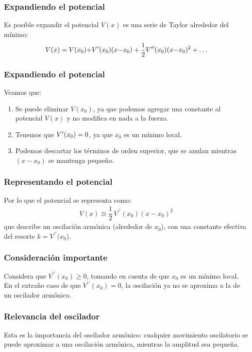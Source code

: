 \documentclass[12pt]{beamer}
\begin{document}
\begin{frame}
\frametitle{Expandiendo el potencial}
Es posible expandir el potencial $V(x)$ es una serie de Taylor alrededor del mínimo:
\pause
\begin{align*}
V(x) = V(x_{0}) {+} {V}^{\prime} (x_{0}) (x {-} x_{0}) + \dfrac{1}{2} {V}^{\prime \prime} (x_{0}) (x {-} x_{0})^{2} + \ldots
\end{align*}
\end{frame}
\begin{frame}
\frametitle{Expandiendo el potencial}
Veamos que:
\pause
{}
\begin{enumerate}[<+->]
\item Se puede eliminar $V(x_{0})$, ya que podemos agregar una constante al potencial $V(x)$ y no modifica en nada a la fuerza.
\item Tenemos que ${V}^{\prime} (x_{0}) = 0$, ya que $x_{0}$ es un mínimo local.
\item Podemos descartar los términos de orden superior, que se anulan mientras $(x - x_{0})$ se mantenga pequeño.
\end{enumerate}
\end{frame}
\begin{frame}
\frametitle{Representando el potencial}
Por lo que el potencial se representa como:
\pause
\begin{align*}
V(x) \cong \dfrac{1}{2} \, V^{\prime \prime} (x_{0}) (x - x_{0})^{2}
\end{align*}
\pause
que describe un oscilación armónica (alrededor de $x_{0}$), con una constante efectiva del resorte $k = V^{\prime \prime} (x_{0}$).
\end{frame}
\begin{frame}
\frametitle{Consideración importante}
Considera que $V^{\prime \prime}(x_{0})\geq 0$, \pause tomando en cuenta de que $x_{0}$ es un mínimo local.
\\
\bigskip
\pause
En el extraño caso de que $V^{\prime \prime} (x_{0})= 0$, \pause la oscilación ya no se aproxima a la de un oscilador armónico.
\end{frame}
\begin{frame}
\frametitle{Relevancia del oscilador}
Esta es la importancia del oscilador armónico: \pause cualquier movimiento oscilatorio se puede aproximar a una oscilación armónica, mientras la amplitud sea pequeña.
\end{frame}
\end{document}

